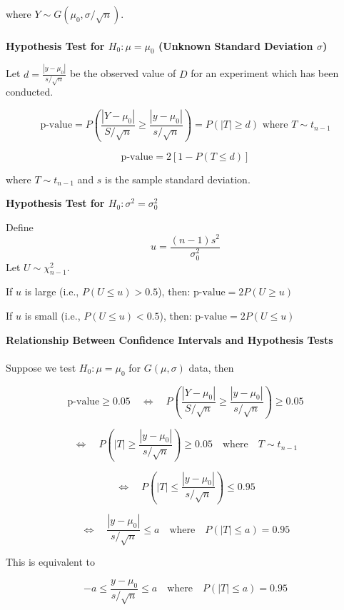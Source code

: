 \documentclass[a4paper,12pt]{article}
\begin{document}
where \( Y \sim G(\mu_0, \sigma / \sqrt{n}) \).
\\
\\\textbf{Hypothesis Test for \( H_0 : \mu = \mu_0 \) (Unknown Standard Deviation \( \sigma \))}

Let \( d = \frac{|y - \mu_0|}{s / \sqrt{n}} \) be the observed value of \( D \) for an experiment which has been conducted.

\[
\text{p-value} = P\left(\frac{|Y - \mu_0|}{S / \sqrt{n}} \geq \frac{|y - \mu_0|}{s / \sqrt{n}}\right)
= P(|T| \geq d) \text{ where } T \sim t_{n-1}
\]

\[
\text{p-value} = 2[1 - P(T \leq d)]
\]

where \( T \sim t_{n-1} \) and \( s \) is the sample standard deviation.

\medskip

\noindent\textbf{Hypothesis Test for \( H_0 : \sigma^2 = \sigma_0^2 \)}

Define 
   \[
   u = \frac{(n-1)s^2}{\sigma_0^2}
   \]
   Let \( U \sim \chi^2_{n-1} \).
   
If \( u \) is large (i.e., \( P(U \leq u) > 0.5 \)), then:
   $\text{p-value} = 2P(U \geq u)$
   
If \( u \) is small (i.e., \( P(U \leq u) < 0.5 \)), then:
   $\text{p-value} = 2P(U \leq u)$

\medskip

\noindent\textbf{Relationship Between Confidence Intervals and Hypothesis Tests}
\\
\\Suppose we test \( H_0 : \mu = \mu_0 \) for \( G(\mu, \sigma) \) data, then

\[
\text{p-value} \geq 0.05
\quad \Leftrightarrow \quad P\left( \frac{|Y - \mu_0|}{S / \sqrt{n}} \geq \frac{|y - \mu_0|}{s / \sqrt{n}} \right) \geq 0.05
\]

\[
\Leftrightarrow \quad P\left( |T| \geq \frac{|y - \mu_0|}{s / \sqrt{n}} \right) \geq 0.05 \quad \text{where} \quad T \sim t_{n-1}
\]

\[
\Leftrightarrow \quad P\left( |T| \leq \frac{|y - \mu_0|}{s / \sqrt{n}} \right) \leq 0.95
\]

\[
\Leftrightarrow \quad \frac{|y - \mu_0|}{s / \sqrt{n}} \leq a \quad \text{where} \quad P(|T| \leq a) = 0.95
\]

\newpage
This is equivalent to

\[
-a \leq \frac{y - \mu_0}{s / \sqrt{n}} \leq a \quad \text{where} \quad P(|T| \leq a) = 0.95
\]
\end{document}
